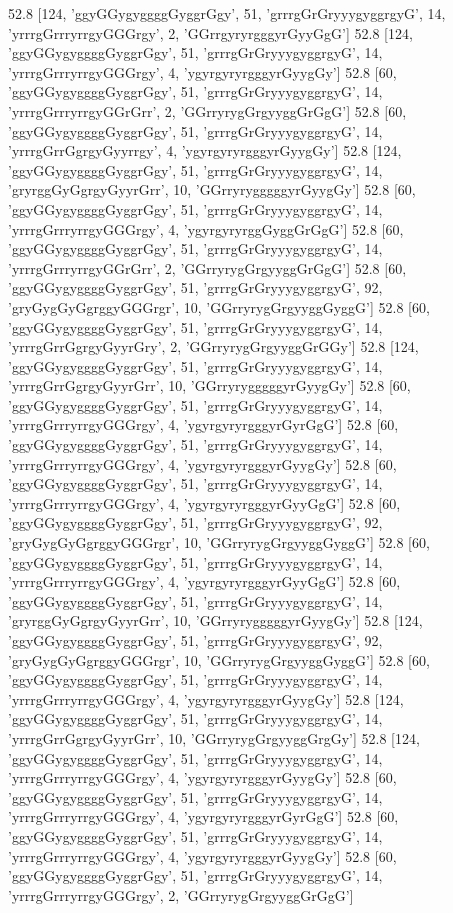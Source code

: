 52.8 [124, 'ggyGGygyggggGyggrGgy', 51, 'grrrgGrGryyygyggrgyG', 14, 'yrrrgGrrryrrgyGGGrgy', 2, 'GGrrgyryrgggyrGyyGgG']
52.8 [124, 'ggyGGygyggggGyggrGgy', 51, 'grrrgGrGryyygyggrgyG', 14, 'yrrrgGrrryrrgyGGGrgy', 4, 'ygyrgyryrgggyrGyygGy']
52.8 [60, 'ggyGGygyggggGyggrGgy', 51, 'grrrgGrGryyygyggrgyG', 14, 'yrrrgGrrryrrgyGGrGrr', 2, 'GGrryrygGrgyyggGrGgG']
52.8 [60, 'ggyGGygyggggGyggrGgy', 51, 'grrrgGrGryyygyggrgyG', 14, 'yrrrgGrrGgrgyGyyrrgy', 4, 'ygyrgyryrgggyrGyygGy']
52.8 [124, 'ggyGGygyggggGyggrGgy', 51, 'grrrgGrGryyygyggrgyG', 14, 'gryrggGyGgrgyGyyrGrr', 10, 'GGrryrygggggyrGyygGy']
52.8 [60, 'ggyGGygyggggGyggrGgy', 51, 'grrrgGrGryyygyggrgyG', 14, 'yrrrgGrrryrrgyGGGrgy', 4, 'ygyrgyryrggGyggGrGgG']
52.8 [60, 'ggyGGygyggggGyggrGgy', 51, 'grrrgGrGryyygyggrgyG', 14, 'yrrrgGrrryrrgyGGrGrr', 2, 'GGrryrygGrgyyggGrGgG']
52.8 [60, 'ggyGGygyggggGyggrGgy', 51, 'grrrgGrGryyygyggrgyG', 92, 'gryGygGyGgrggyGGGrgr', 10, 'GGrryrygGrgyyggGyggG']
52.8 [60, 'ggyGGygyggggGyggrGgy', 51, 'grrrgGrGryyygyggrgyG', 14, 'yrrrgGrrGgrgyGyyrGry', 2, 'GGrryrygGrgyyggGrGGy']
52.8 [124, 'ggyGGygyggggGyggrGgy', 51, 'grrrgGrGryyygyggrgyG', 14, 'yrrrgGrrGgrgyGyyrGrr', 10, 'GGrryrygggggyrGyygGy']
52.8 [60, 'ggyGGygyggggGyggrGgy', 51, 'grrrgGrGryyygyggrgyG', 14, 'yrrrgGrrryrrgyGGGrgy', 4, 'ygyrgyryrgggyrGyrGgG']
52.8 [60, 'ggyGGygyggggGyggrGgy', 51, 'grrrgGrGryyygyggrgyG', 14, 'yrrrgGrrryrrgyGGGrgy', 4, 'ygyrgyryrgggyrGyygGy']
52.8 [60, 'ggyGGygyggggGyggrGgy', 51, 'grrrgGrGryyygyggrgyG', 14, 'yrrrgGrrryrrgyGGGrgy', 4, 'ygyrgyryrgggyrGyyGgG']
52.8 [60, 'ggyGGygyggggGyggrGgy', 51, 'grrrgGrGryyygyggrgyG', 92, 'gryGygGyGgrggyGGGrgr', 10, 'GGrryrygGrgyyggGyggG']
52.8 [60, 'ggyGGygyggggGyggrGgy', 51, 'grrrgGrGryyygyggrgyG', 14, 'yrrrgGrrryrrgyGGGrgy', 4, 'ygyrgyryrgggyrGyyGgG']
52.8 [60, 'ggyGGygyggggGyggrGgy', 51, 'grrrgGrGryyygyggrgyG', 14, 'gryrggGyGgrgyGyyrGrr', 10, 'GGrryrygggggyrGyygGy']
52.8 [124, 'ggyGGygyggggGyggrGgy', 51, 'grrrgGrGryyygyggrgyG', 92, 'gryGygGyGgrggyGGGrgr', 10, 'GGrryrygGrgyyggGyggG']
52.8 [60, 'ggyGGygyggggGyggrGgy', 51, 'grrrgGrGryyygyggrgyG', 14, 'yrrrgGrrryrrgyGGGrgy', 4, 'ygyrgyryrgggyrGyygGy']
52.8 [124, 'ggyGGygyggggGyggrGgy', 51, 'grrrgGrGryyygyggrgyG', 14, 'yrrrgGrrGgrgyGyyrGrr', 10, 'GGrryrygGrgyyggGrgGy']
52.8 [124, 'ggyGGygyggggGyggrGgy', 51, 'grrrgGrGryyygyggrgyG', 14, 'yrrrgGrrryrrgyGGGrgy', 4, 'ygyrgyryrgggyrGyygGy']
52.8 [60, 'ggyGGygyggggGyggrGgy', 51, 'grrrgGrGryyygyggrgyG', 14, 'yrrrgGrrryrrgyGGGrgy', 4, 'ygyrgyryrgggyrGyrGgG']
52.8 [60, 'ggyGGygyggggGyggrGgy', 51, 'grrrgGrGryyygyggrgyG', 14, 'yrrrgGrrryrrgyGGGrgy', 4, 'ygyrgyryrgggyrGyygGy']
52.8 [60, 'ggyGGygyggggGyggrGgy', 51, 'grrrgGrGryyygyggrgyG', 14, 'yrrrgGrrryrrgyGGGrgy', 2, 'GGrryrygGrgyyggGrGgG']
